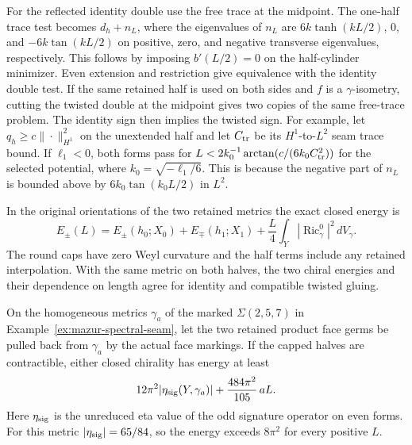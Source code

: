 For the reflected identity double use the free trace at the
midpoint. The one-half trace test becomes \(d_h+n_L\), where
the eigenvalues of \(n_L\) are \(6k\tanh(kL/2)\), \(0\), and
\(-6k\tan(kL/2)\) on positive, zero, and negative transverse
eigenvalues, respectively. This follows by imposing
\(b'(L/2)=0\) on the half-cylinder minimizer. Even extension and
restriction give equivalence with the identity double test.
If the same retained half is used on both sides and \(f\) is
a \(\gamma\)-isometry, cutting the twisted double at the
midpoint gives two copies of the same free-trace problem.
The identity sign then implies the twisted sign.
For example, let \(q_h\ge c\|\cdot\|_{H^1}^2\) on the unextended
half and let \(C_{\rm tr}\) be its \(H^1\)-to-\(L^2\) seam
trace bound. If \(\ell_1<0\), both forms pass for
\(L<2k_0^{-1}\arctan(c/(6k_0 C_{\rm tr}^2))\) for the selected
potential, where \(k_0=\sqrt{-\ell_1/6}\). This is because the
negative part of \(n_L\) is bounded above by
\(6k_0\tan(k_0L/2)\) in \(L^2\).

In the original orientations of the two retained metrics
the exact closed energy is
\begin{equation}
 \label{eq:short-seam-energy}
 E_\pm(L)=E_\pm(h_0;X_0)+E_\mp(h_1;X_1)
       +\frac L4\int_Y|\operatorname{Ric}^0_\gamma|^2\,dV_\gamma.
\end{equation}
The round caps have zero Weyl curvature and the half terms
include any retained interpolation. With the same metric on
both halves, the two chiral energies and their dependence on
length agree for identity and compatible twisted gluing.

\begin{proposition}
\label{prop:short-seam-aps}
On the homogeneous metrics \(\gamma_a\) of the marked
\(\Sigma(2,5,7)\) in Example~\ref{ex:mazur-spectral-seam},
let the two retained product face germs be pulled back from
\(\gamma_a\) by the actual face markings. If the capped halves
are contractible, either closed chirality has energy at least
\[
 12\pi^2|\eta_{\rm sig}(Y,\gamma_a)|
       +\frac{484\pi^2}{105}\,aL .
\]
Here \(\eta_{\rm sig}\) is the unreduced eta value of the
odd signature operator on even forms. For this metric
\(|\eta_{\rm sig}|=65/84\), so the energy exceeds
\(8\pi^2\) for every positive \(L\).
\end{proposition}

